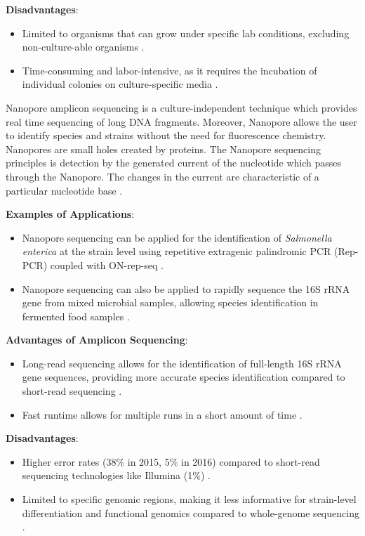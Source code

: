 \textbf{Disadvantages}:
\begin{itemize}
    \item Limited to organisms that can grow under specific lab conditions, excluding non-culture-able organisms \cite*{L5-HighThroughput}.
    \item Time-consuming and labor-intensive, as it requires the incubation of individual colonies on culture-specific media \cite*{L5-DNAEnrichment}.
\end{itemize}

Nanopore amplicon sequencing is a culture-independent technique which provides real time sequencing of long DNA fragments. Moreover, Nanopore allows the user to identify species and strains without the need for fluorescence chemistry. 
Nanopores are small holes created by proteins. The Nanopore sequencing principles is detection by the generated current of the nucleotide which passes through the Nanopore. The changes in the current are characteristic of a particular nucleotide base \cite*{LS10,L3-SeqBasedClass}.

\textbf{Examples of Applications}:
\begin{itemize}
    \item Nanopore sequencing can be applied for the identification of \textit{Salmonella enterica} at the strain level using repetitive extragenic palindromic PCR (Rep-PCR) coupled with ON-rep-seq \cite*{L5-DNAEnrichment}.
    \item Nanopore sequencing can also be applied to rapidly sequence the 16S rRNA gene from mixed microbial samples, allowing species identification in fermented food samples \cite*{L3-SeqBasedClass}.
\end{itemize}


\textbf{Advantages of Amplicon Sequencing}:

\begin{itemize}
    \item Long-read sequencing allows for the identification of full-length 16S rRNA gene sequences, providing more accurate species identification compared to short-read sequencing \cite*{LS10}.
    \item Fast runtime allows for multiple runs in a short amount of time \cite*{LS10}.
\end{itemize}

\textbf{Disadvantages}:
\begin{itemize}
    \item Higher error rates (38\% in 2015, 5\% in 2016) compared to short-read sequencing technologies like Illumina (1\%) \cite*{LS10}.
    \item Limited to specific genomic regions, making it less informative for strain-level differentiation and functional genomics compared to whole-genome sequencing \cite*{L5-DNAEnrichment}.
\end{itemize}

